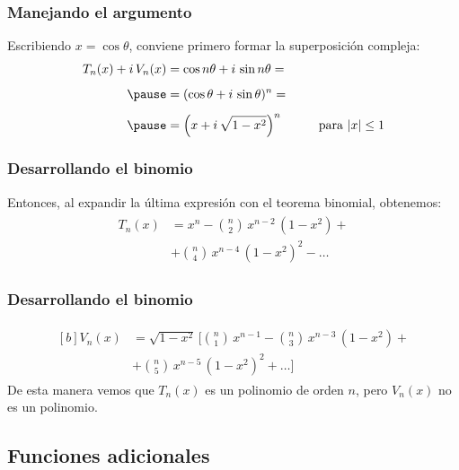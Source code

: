 \documentclass[12pt]{beamer}
\begin{document}
\begin{frame}
\frametitle{Manejando el argumento}
Escribiendo $x = \cos \theta$, conviene primero formar la superposición compleja:
\pause
\begin{eqnarray*}
\begin{aligned}
T_{n} (x) + i \, V_{n} (x) &= \cos n \theta + i \, \sin n \theta = \\[0.5em] \pause
&= (\cos \theta + i \, \sin \theta)^{n} = \\[0.5em] \pause
&= \left( x + i \, \sqrt{1- x^{2}} \right)^{n} \hspace{1cm} \mbox{para  } \abs{x} \leq 1
\end{aligned}
\end{eqnarray*}
\end{frame}
\begin{frame}
\frametitle{Desarrollando el binomio}
Entonces, al expandir la última expresión con el teorema binomial, obtenemos:
\pause
\begin{align}
\begin{aligned}
T_{n} (x) &= x^{n} - \binom{n}{2} \, x^{n-2} \, (1 - x^{2}) + \\[1em]
&+ \binom{n}{4} \, x^{n-4} \, (1 - x^{2})^{2} - \ldots
\end{aligned}
\label{eq:ecuacion_18_056}
\end{align}
\end{frame}
\begin{frame}
\frametitle{Desarrollando el binomio}
\begin{align}
\begin{aligned}[b]
V_{n} (x) &= \sqrt{1 {-} x^{2}} \, \bigg[ \binom{n}{1} \, x^{n-1} {-} \binom{n}{3} \, x^{n-3} \, (1 {-} x^{2}) + \\[0.5em]
&+ \binom{n}{5} \, x^{n-5} \, (1 {-} x^{2})^{2} + \ldots \bigg]
\end{aligned}
\label{eq:ecuacion_18_057}
\end{align}
De esta manera vemos que $T_{n} (x)$ es un polinomio de orden $n$, pero $V_{n} (x)$ no es un polinomio.
\end{frame}

\subsection{Funciones adicionales}
\end{document}
